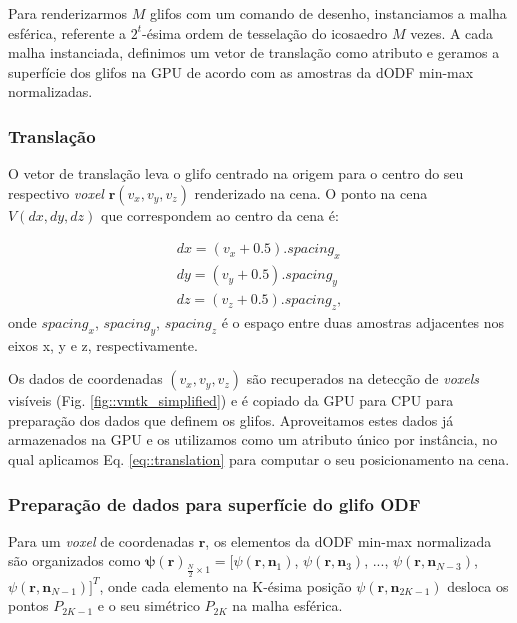 Para renderizarmos $M$ glifos com um comando de desenho, instanciamos a malha esférica, referente a $2^t$-ésima ordem de tesselação do icosaedro $M$ vezes. A cada malha instanciada, definimos um vetor de translação como atributo e geramos a superfície dos glifos na GPU de acordo com as amostras da dODF min-max normalizadas.

\subsubsection{Translação}
\label{ssec::translacao}

O vetor de translação leva o glifo centrado na origem para o centro do seu respectivo \textit{voxel} $\mathbf{r}(v_x, v_y, v_z)$ renderizado na cena. O ponto na cena $V(dx, dy, dz)$ que correspondem ao centro da cena é:

\begin{align}
 \label{eq::translation}
    dx = (v_x + 0.5).spacing_x \nonumber\\
    dy = (v_y + 0.5).spacing_y \\
    dz = (v_z + 0.5).spacing_z \nonumber,
\end{align}
onde $spacing_x$, $spacing_y$, $spacing_z$ é o espaço entre duas amostras adjacentes nos eixos x, y e z, respectivamente.

Os dados de coordenadas $(v_x, v_y, v_z)$ são recuperados na detecção de \textit{voxels} visíveis (Fig. \ref{fig::vmtk_simplified}) e é copiado da GPU para CPU para preparação dos dados que definem os glifos. Aproveitamos estes dados já armazenados na GPU e os utilizamos como um atributo único por instância, no qual aplicamos Eq. \ref{eq::translation} para computar o seu posicionamento na cena. %

\subsubsection{Preparação de dados para superfície do glifo ODF}
\label{ssec::preparacao_de_dados}

Para um \textit{voxel} de coordenadas $\mathbf{r}$, os elementos da dODF min-max normalizada são organizados como $\boldsymbol{\psi}(\mathbf{r})_{\frac{N}{2} \times 1} = [
\psi(\mathbf{r}, \mathbf{n}_1)$,
$\psi(\mathbf{r}, \mathbf{n}_3)$, ...,
$\psi(\mathbf{r}, \mathbf{n}_{N-3})$,
$\psi(\mathbf{r}, \mathbf{n}_{N-1})]^T$, onde cada elemento na K-ésima posição $\psi(\mathbf{r}, \mathbf{n}_{2K-1})$ desloca os pontos $P_{2K-1}$ e o seu simétrico $P_{2K}$ na malha esférica.

